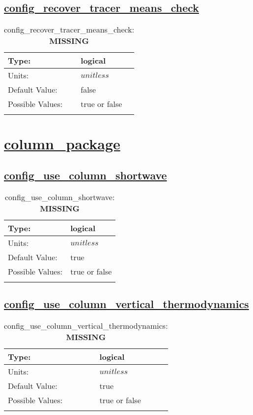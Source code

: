\subsection[config\_recover\_tracer\_means\_check]{\hyperref[sec:nm_tab_advection]{config\_recover\_tracer\_means\_check}}
\label{subsec:nm_sec_config_recover_tracer_means_check}
\begin{center}
\begin{longtable}{| p{2.0in} || p{4.0in} |}
    \hline
    Type: & logical \\
    \hline
    Units: & $unitless$ \\
    \hline
    Default Value: & false \\
    \hline
    Possible Values: & true or false \\
    \hline
    \caption{config\_recover\_tracer\_means\_check: {\bf \color{red} MISSING}}
\end{longtable}
\end{center}
\section[column\_package]{\hyperref[sec:nm_tab_column_package]{column\_package}}
\label{sec:nm_sec_column_package}
\subsection[config\_use\_column\_shortwave]{\hyperref[sec:nm_tab_column_package]{config\_use\_column\_shortwave}}
\label{subsec:nm_sec_config_use_column_shortwave}
\begin{center}
\begin{longtable}{| p{2.0in} || p{4.0in} |}
    \hline
    Type: & logical \\
    \hline
    Units: & $unitless$ \\
    \hline
    Default Value: & true \\
    \hline
    Possible Values: & true or false \\
    \hline
    \caption{config\_use\_column\_shortwave: {\bf \color{red} MISSING}}
\end{longtable}
\end{center}
\subsection[config\_use\_column\_vertical\_thermodynamics]{\hyperref[sec:nm_tab_column_package]{config\_use\_column\_vertical\_thermodynamics}}
\label{subsec:nm_sec_config_use_column_vertical_thermodynamics}
\begin{center}
\begin{longtable}{| p{2.0in} || p{4.0in} |}
    \hline
    Type: & logical \\
    \hline
    Units: & $unitless$ \\
    \hline
    Default Value: & true \\
    \hline
    Possible Values: & true or false \\
    \hline
    \caption{config\_use\_column\_vertical\_thermodynamics: {\bf \color{red} MISSING}}
\end{longtable}
\end{center}
